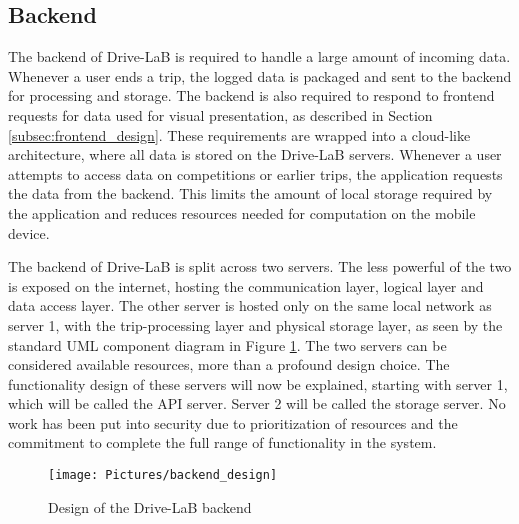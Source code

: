 \subsection{Backend}\label{subsec:backend_design}
The backend of Drive-LaB is required to handle a large amount of incoming data. Whenever a user ends a trip, the logged data is packaged and sent to the backend for processing and storage. The backend is also required to respond to frontend requests for data used for visual presentation, as described in Section \ref{subsec:frontend_design}. These requirements are wrapped into a cloud-like architecture, where all data is stored on the Drive-LaB servers. Whenever a user attempts to access data on competitions or earlier trips, the application requests the data from the backend. This limits the amount of local storage required by the application and reduces resources needed for computation on the mobile device.

The backend of Drive-LaB is split across two servers. The less powerful of the two is exposed on the internet, hosting the communication layer, logical layer and data access layer. The other server is hosted only on the same local network as server 1, with the trip-processing layer and physical storage layer, as seen by the standard UML component diagram in Figure \ref{fig:backend_design}. The two servers can be considered available resources, more than a profound design choice. The functionality design of these servers will now be explained, starting with server 1, which will be called the API server. Server 2 will be called the storage server. No work has been put into security due to prioritization of resources and the commitment to complete the full range of functionality in the system.

\begin{figure}[tb]
\centering
\texttt{[image: Pictures/backend\_design]}
\caption{Design of the Drive-LaB backend}
\label{fig:backend_design}
\end{figure}